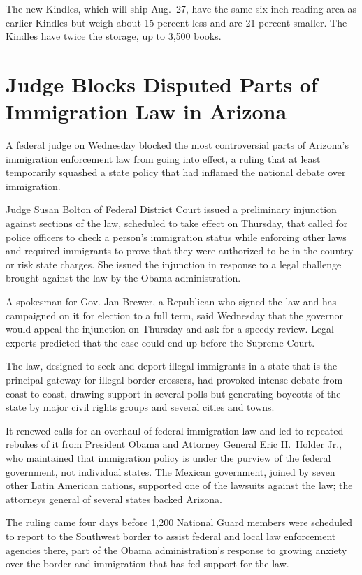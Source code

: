 ﻿\documentclass[12pt]{article}
\begin{document}
The new Kindles, which will ship Aug.~27, have the same six-inch reading area as earlier Kindles but
weigh about 15 percent less and are 21 percent smaller. The Kindles have twice the storage, up to
3,500 books.

\section{Judge Blocks Disputed Parts of Immigration Law in Arizona}

\lettrine{A}{} federal judge on Wednesday blocked the most controversial
parts of Arizona's immigration enforcement law from going into effect, a ruling that at least
temporarily squashed a state policy that had inflamed the national debate over immigration.

Judge Susan Bolton of Federal District Court issued a preliminary injunction against sections of the
law, scheduled to take effect on Thursday, that called for police officers to check a person's
immigration status while enforcing other laws and required immigrants to prove that they were
authorized to be in the country or risk state charges. She issued the injunction in response to a
legal challenge brought against the law by the Obama administration.

A spokesman for Gov. Jan Brewer, a Republican who signed the law and has campaigned on it for
election to a full term, said Wednesday that the governor would appeal the injunction on Thursday
and ask for a speedy review. Legal experts predicted that the case could end up before the Supreme
Court.

The law, designed to seek and deport illegal immigrants in a state that is the principal gateway for
illegal border crossers, had provoked intense debate from coast to coast, drawing support in several
polls but generating boycotts of the state by major civil rights groups and several cities and
towns.

It renewed calls for an overhaul of federal immigration law and led to repeated rebukes of it from
President Obama and Attorney General Eric H.~Holder Jr., who maintained that immigration policy is
under the purview of the federal government, not individual states. The Mexican government, joined
by seven other Latin American nations, supported one of the lawsuits against the law; the attorneys
general of several states backed Arizona.

The ruling came four days before 1,200 National Guard members were scheduled to report to the
Southwest border to assist federal and local law enforcement agencies there, part of the Obama
administration's response to growing anxiety over the border and immigration that has fed support
for the law.
\end{document}
